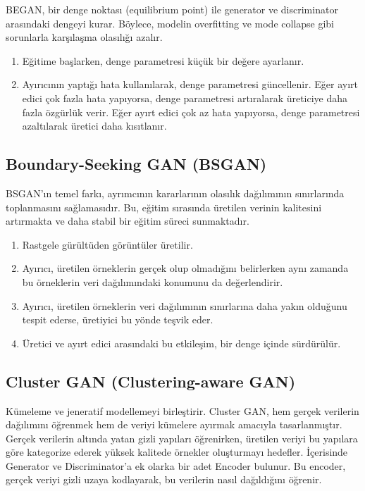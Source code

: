 BEGAN, bir denge noktası (equilibrium point) ile generator ve discriminator arasındaki dengeyi kurar. Böylece, modelin overfitting ve mode collapse gibi sorunlarla karşılaşma olasılığı azalır. 

\begin{enumerate}
    \item Eğitime başlarken, denge parametresi küçük bir değere ayarlanır. 
    \item Ayırıcının yaptığı hata kullanılarak, denge parametresi güncellenir. Eğer ayırt edici çok fazla hata yapıyorsa, denge parametresi artıralarak üreticiye daha fazla özgürlük verir. Eğer ayırt edici çok az hata yapıyorsa, denge parametresi azaltılarak üretici daha kısıtlanır.
\end{enumerate}

\subsection{Boundary-Seeking GAN (BSGAN)}

BSGAN'ın temel farkı, ayrımcının kararlarının olasılık dağılımının sınırlarında toplanmasını sağlamasıdır. Bu, eğitim sırasında üretilen verinin kalitesini artırmakta ve daha stabil bir eğitim süreci sunmaktadır.

\begin{enumerate}
    \item Rastgele gürültüden görüntüler üretilir.
    \item Ayırıcı, üretilen örneklerin gerçek olup olmadığını belirlerken aynı zamanda bu örneklerin veri dağılımındaki konumunu da değerlendirir.
    \item Ayırıcı, üretilen örneklerin veri dağılımının sınırlarına daha yakın olduğunu tespit ederse, üretiyici bu yönde teşvik eder.
    \item Üretici ve ayırt edici arasındaki bu etkileşim, bir denge içinde sürdürülür.
\end{enumerate}

\subsection{Cluster GAN (Clustering-aware GAN)}

Kümeleme ve jeneratif modellemeyi birleştirir. Cluster GAN, hem gerçek verilerin dağılımını öğrenmek hem de veriyi kümelere ayırmak amacıyla tasarlanmıştır. Gerçek verilerin altında yatan gizli yapıları öğrenirken, üretilen veriyi bu yapılara göre kategorize ederek yüksek kalitede örnekler oluşturmayı hedefler. İçerisinde Generator ve Discriminator'a ek olarka bir adet Encoder bulunur. Bu encoder, gerçek veriyi gizli uzaya kodlayarak, bu verilerin nasıl dağıldığını öğrenir.

